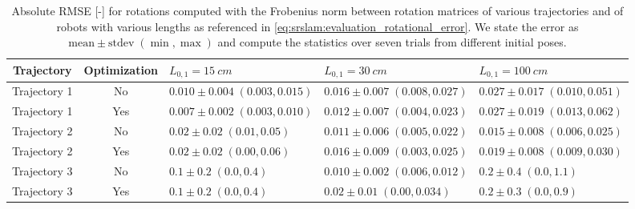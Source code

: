 \iffalse
\begin{table}
\centering
\caption{Absolute \gls{RMSE} [-] for rotations computed with the Frobenius norm between rotation matrices of various trajectories and of robots with various lengths as referenced in \eqref{eq:srslam:evaluation_rotational_error}. We state the error as $\text{mean} \pm \text{stdev} \; (\min, \max)$ and compute the statistics over seven trials from different initial poses.}
\begin{tabular}{cclll}\toprule
\textbf{Trajectory} & \textbf{Optimization} & $L_{0,1} = \SI{15}{cm}$ & $L_{0,1} = \SI{30}{cm}$ & $L_{0,1} = \SI{100}{cm}$\\
\midrule
    Trajectory 1 & No & $0.010 \pm 0.004 \; (0.003, 0.015)$ & $0.016 \pm 0.007 \; (0.008, 0.027)$ & $0.027 \pm 0.017 \; (0.010, 0.051)$ \\
    Trajectory 1 & Yes & $0.007 \pm 0.002 \; (0.003, 0.010)$ & $0.012 \pm 0.007 \; (0.004, 0.023)$ & $0.027 \pm 0.019 \; (0.013, 0.062)$ \\
    \midrule
    Trajectory 2 & No & $0.02 \pm 0.02 \; (0.01, 0.05)$ & $0.011 \pm 0.006 \; (0.005, 0.022)$ & $0.015 \pm 0.008 \; (0.006, 0.025)$ \\
    Trajectory 2 & Yes & $0.02 \pm 0.02 \; (0.00, 0.06)$ & $0.016 \pm 0.009 \; (0.003, 0.025)$ & $0.019 \pm 0.008 \; (0.009, 0.030)$ \\
    \midrule
    Trajectory 3 & No & $0.1 \pm 0.2 \; (0.0, 0.4)$ & $0.010 \pm 0.002 \; (0.006, 0.012)$ & $0.2 \pm 0.4 \; (0.0, 1.1)$ \\
    Trajectory 3 & Yes & $0.1 \pm 0.2 \; (0.0, 0.4)$ & $0.02 \pm 0.01 \; (0.00, 0.034)$ & $0.2 \pm 0.3 \; (0.0, 0.9)$ \\
\bottomrule
\end{tabular}
\label{tab:srslam:results_simulations_rotation_frobenius}
\end{table}


